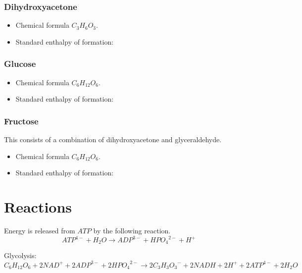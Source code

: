\documentclass{article}
\begin{document}
\subsubsection{Dihydroxyacetone}
\begin{itemize}
    \item Chemical formula $C_3H_6O_3$.
    \item Standard enthalpy of formation:
\end{itemize}

\subsubsection{Glucose}
\begin{itemize}
    \item Chemical formula $C_6H_{12}O_6$.
    \item Standard enthalpy of formation:
\end{itemize}

\subsubsection{Fructose}
This consists of a combination of dihydroxyacetone and glyceraldehyde.

\begin{itemize}
    \item Chemical formula $C_6H_{12}O_6$.
    \item Standard enthalpy of formation:
\end{itemize}



\pagebreak
\section{Reactions}\label{sec_reactions}

Energy is released from $ATP$ by the following reaction.
\[
    {ATP}^{4-} + H_2O \rightarrow {ADP}^{3-} + {HPO_4}^{2-} + H^+
\]

Glycolysis:
\[
    C_6H_{12}O_6 + 2{NAD}^+ + 2{ADP}^{3-} + 2{HPO_4}^{2-} \rightarrow
    2{C_3H_3O_3}^- + 2NADH + 2H^+ + 2{ATP}^{4-} + 2H_2O
\]
\end{document}
